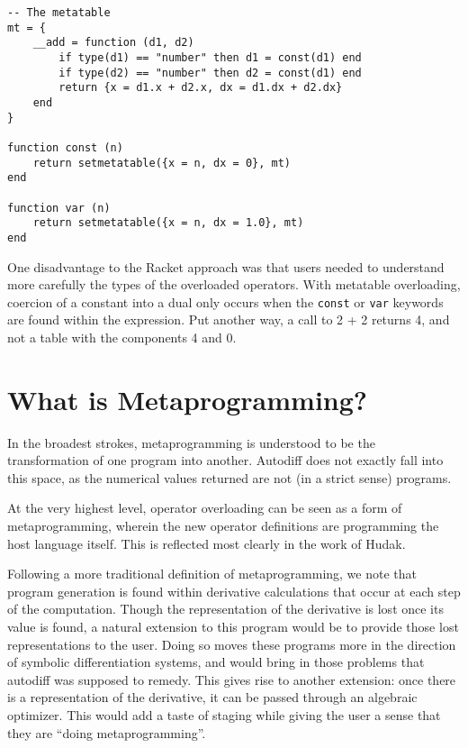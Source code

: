 \documentclass[font=9pt]{article}
\begin{document}
\begin{lstlisting}[basicstyle=\small,
                   captionpos=b,
                   caption={Dual Contstructors and Dual Addition in Lua}]
-- The metatable
mt = {
    __add = function (d1, d2)
        if type(d1) == "number" then d1 = const(d1) end
        if type(d2) == "number" then d2 = const(d1) end
        return {x = d1.x + d2.x, dx = d1.dx + d2.dx}
    end
}

function const (n)
    return setmetatable({x = n, dx = 0}, mt)
end

function var (n)
    return setmetatable({x = n, dx = 1.0}, mt)
end
\end{lstlisting}

One disadvantage to the Racket approach was that users needed to understand more
carefully the types of the overloaded operators.  With metatable overloading,
coercion of a constant into a dual only occurs when the \lstinline{const} or
\lstinline{var} keywords are found within the expression.  Put another way,
a call to 2 + 2 returns 4, and not a table with the components 4 and 0.

\section{What is Metaprogramming?}
In the broadest strokes, metaprogramming is understood to be the
transformation of one program into another.  Autodiff does not exactly fall into
this space, as the numerical values returned are not (in a strict sense) programs.

At the very highest level, operator overloading can be seen as a form of
metaprogramming, wherein the new operator definitions are programming the host
language itself.  This is reflected most clearly in the work of Hudak\cite{hudak}.

Following a more traditional definition of metaprogramming, we note
that program generation is found within derivative calculations that occur at
each step of the computation.  Though the representation of the derivative is
lost once its value is found, a natural extension to this program would be to
provide those lost representations to the user.  Doing so moves these programs
more in the direction of symbolic differentiation systems, and would bring in those
problems that autodiff was supposed to remedy.  This gives rise to another
extension: once there is a representation of the derivative, it can be passed
through an algebraic optimizer.  This would add a taste of staging while giving
the user a sense that they are ``doing metaprogramming''.
\end{document}
